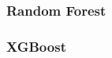 \documentclass[12pt,a4paper,oneside]{article}
\begin{document}
\subsubsection{Random Forest}\label{subsubsec:rf}

%


\subsubsection{XGBoost}\label{subsubsec:xgb}

%
%
%
\end{document}
